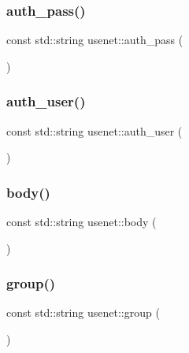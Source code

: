 \hypertarget{namespaceusenet_a266baf03d35982ff183bfdcb01326b01}{}\label{namespaceusenet_a266baf03d35982ff183bfdcb01326b01} 
\subsubsection{\texorpdfstring{auth\+\_\+pass()}{auth\_pass()}}
{\footnotesize\ttfamily const std\+::string usenet\+::auth\+\_\+pass (\begin{DoxyParamCaption}\item[{\char`\"{}A\+U\+T\+H\+I\+N\+FO pass \char`\"{}}]{ }\end{DoxyParamCaption})}

\hypertarget{namespaceusenet_a543536caf44c46e1ef91b03409a1bc99}{}\label{namespaceusenet_a543536caf44c46e1ef91b03409a1bc99} 
\subsubsection{\texorpdfstring{auth\+\_\+user()}{auth\_user()}}
{\footnotesize\ttfamily const std\+::string usenet\+::auth\+\_\+user (\begin{DoxyParamCaption}\item[{\char`\"{}A\+U\+T\+H\+I\+N\+FO user \char`\"{}}]{ }\end{DoxyParamCaption})}

\hypertarget{namespaceusenet_a100420ce7bc256dfc9b258200c6f3fa1}{}\label{namespaceusenet_a100420ce7bc256dfc9b258200c6f3fa1} 
\subsubsection{\texorpdfstring{body()}{body()}}
{\footnotesize\ttfamily const std\+::string usenet\+::body (\begin{DoxyParamCaption}\item[{\char`\"{}B\+O\+DY \char`\"{}}]{ }\end{DoxyParamCaption})}

\hypertarget{namespaceusenet_a2dbc6a7dd18e3c88d96656a2db9849d1}{}\label{namespaceusenet_a2dbc6a7dd18e3c88d96656a2db9849d1} 
\subsubsection{\texorpdfstring{group()}{group()}}
{\footnotesize\ttfamily const std\+::string usenet\+::group (\begin{DoxyParamCaption}\item[{\char`\"{}G\+R\+O\+UP \char`\"{}}]{ }\end{DoxyParamCaption})}

